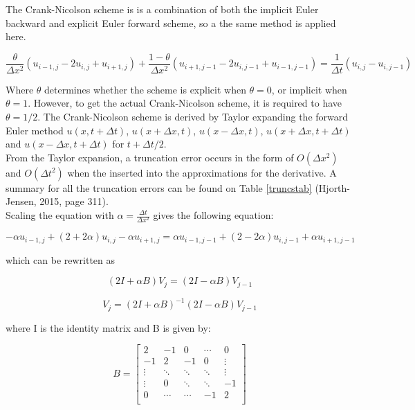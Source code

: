 \documentclass[10pt,a4paper]{article}
\begin{document}
\noindent The Crank-Nicolson scheme is is a combination of both the implicit Euler backward and explicit Euler forward scheme, so a the same method is applied here.

\begin{equation}
\frac{\theta}{\Delta x^2}(u_{i-1,j} - 2u_{i,j} + u_{i+1,j}) + \frac{1 - \theta}{\Delta x^2}(u_{i+1,j-1} - 2u_{i,j-1} + u_{i-1,j-1}) = \frac{1}{\Delta t}(u_{i,j} - u_{i,j-1})
\end{equation}

\noindent Where $\theta$ determines whether the scheme is explicit when $\theta = 0$, or implicit when $\theta = 1$. However, to get the actual Crank-Nicolson scheme, it is required to have $\theta = 1/2$. The Crank-Nicolson scheme is derived by Taylor expanding the forward Euler method $u(x,t + \Delta t)$, $u(x + \Delta x,t)$, $u(x - \Delta x,t)$, $u(x + \Delta x, t + \Delta t)$ and $u(x - \Delta x, t + \Delta t)$ for $t + \Delta t/2$.\\

\noindent From the Taylor expansion, a truncation error occurs in the form of $O(\Delta x^2)$ and $O(\Delta t^2)$ when the inserted into the approximations for the derivative. A summary for all the truncation errors can be found on Table \ref{truncstab} (Hjorth-Jensen, 2015, page 311).\\

\noindent Scaling the equation with $\alpha = \frac{\Delta t}{\Delta x^2}$ gives the following equation:

\begin{equation}
-\alpha u_{i-1,j} + (2 + 2\alpha)u_{i,j} -\alpha u_{i+1,j} = \alpha u_{i-1,j-1} + (2-2\alpha)u_{i,j-1} + \alpha u_{i+1,j-1}
\end{equation}

\noindent which can be rewritten as

\begin{equation}
(2I + \alpha B)V_j = (2I - \alpha B)V_{j-1}
\end{equation}

\begin{equation}
V_j = (2I + \alpha B)^{-1}(2I - \alpha B)V_{j-1}
\end{equation}

\noindent where I is the identity matrix and B is given by:

\begin{equation}
B = \begin{bmatrix}
2 & -1 & 0 & \cdots &0\\
-1 & 2 & -1 & 0 & \vdots\\
\vdots & \ddots & \ddots & \ddots & \vdots\\
\vdots & 0 & \ddots & \ddots & -1\\
0 & \cdots & \cdots & -1 & 2\\
\end{bmatrix}
\end{equation}
\end{document}
